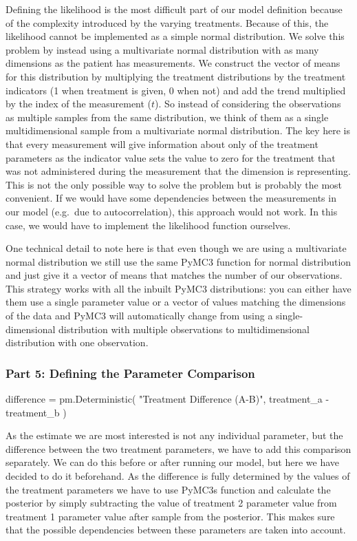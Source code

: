 \documentclass[12pt,a4paper,leqno]{report}
\theoremstyle{plain}
\theoremstyle{definition}
\theoremstyle{remark}
\begin{document}
Defining the likelihood is the most difficult part of our model definition because of the
complexity introduced by the varying treatments. Because of this, the likelihood cannot
be implemented as a simple normal distribution. We solve this problem by instead using a
multivariate normal distribution with as many dimensions as the patient has
measurements. We construct the vector of means for this distribution by multiplying the
treatment distributions by the treatment indicators (1 when
treatment is given, 0 when not) and add the trend multiplied by the index of the
measurement (\(t\)). So instead of considering
the observations as multiple samples from the same distribution, we think of them as a
single multidimensional sample from
a multivariate normal distribution. The key here is that every measurement will give
information about only of the treatment parameters as the indicator value sets the
value to zero for the treatment that was not administered during the
measurement that the dimension is representing. This is not the only possible way to solve the
problem but is probably the most convenient. If we would have some
dependencies between the measurements in our model (e.g.\ due to autocorrelation), this approach
would not work. In this case, we would have to implement the likelihood function
ourselves.

One technical detail to note here is that even though we are using a multivariate normal
distribution we still use the same PyMC3 function for normal distribution and just give
it a vector of means that matches the number of our observations. This strategy works
with all the inbuilt PyMC3 distributions: you can either have them use a single
parameter value or a vector of values matching the dimensions of the data and PyMC3 will automatically
change from using a single-dimensional distribution with multiple observations to
multidimensional distribution with one observation.

\subsubsection*{Part 5: Defining the Parameter Comparison}

\bigskip
\begin{pyverbatim}[][fontsize=\footnotesize]
    difference = pm.Deterministic(
        "Treatment Difference (A-B)", treatment_a - treatment_b
    )
\end{pyverbatim}
\smallskip

As the estimate we are most interested is not any individual parameter, but the
difference between the two treatment parameters, we have to add this comparison separately.
We can do this before or after running our model, but here we have decided to do it
beforehand. As the difference is fully determined by the values of the treatment
parameters we have to use PyMC3s
 function and calculate the posterior
by simply subtracting the value of treatment 2 parameter value from treatment 1
parameter value after sample from the posterior. This makes sure that the possible
dependencies between these parameters are taken into account.
\end{document}
